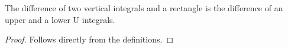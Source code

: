 \begin{lemma}
\label{DiffVertRect_eq_UpperLowerUs}
\leanok
The difference of two vertical integrals and a rectangle is
  the difference of an upper and a lower U integrals.
\end{lemma}
\begin{proof}
\leanok
Follows directly from the definitions.
\end{proof}
